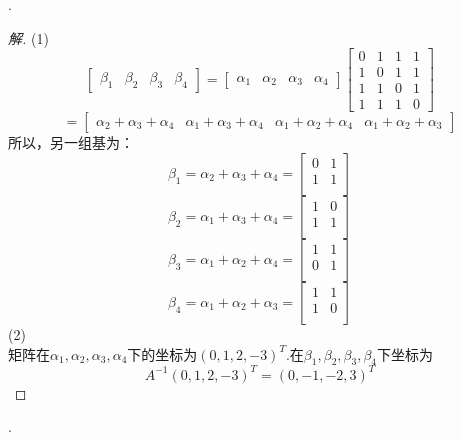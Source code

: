 \documentclass[10pt,a4paper]{report}
\begin{document}
.
\begin{proof}[解]
	(1)
	$$\left[
	\begin{matrix}
	\beta_{1} & \beta_{2} & \beta_{3} & \beta_{4}
	\end{matrix}
	\right] = \left[
	\begin{matrix}
	\alpha_{1} & \alpha_{2} & \alpha_{3} & \alpha_{4}
	\end{matrix}
	\right]\left[
	\begin{matrix}
	0 & 1 & 1 & 1\\
	1 & 0 & 1 & 1\\
	1 & 1 & 0 & 1\\
	1 & 1 & 1 & 0
	\end{matrix}
	\right]$$
	$$=\left[
	\begin{matrix}
	\alpha_{2}+\alpha_{3}+\alpha_{4} & \alpha_{1}+\alpha_{3}+\alpha_{4} & \alpha_{1}+\alpha_{2}+\alpha_{4} & \alpha_{1}+\alpha_{2}+\alpha_{3}
	\end{matrix}
	\right]$$
	所以，另一组基为：
	$$\beta_{1} = \alpha_{2}+\alpha_{3}+\alpha_{4} = \left[
	\begin{matrix}
	0 & 1\\
	1 & 1\\
	\end{matrix}
	\right]$$
	$$
	\beta_{2} = \alpha_{1}+\alpha_{3}+\alpha_{4} = \left[
	\begin{matrix}
	1 & 0\\
	1 & 1\\
	\end{matrix}
	\right]
	$$
	$$
	\beta_{3} = \alpha_{1}+\alpha_{2}+\alpha_{4} = \left[
	\begin{matrix}
	1 & 1\\
	0 & 1\\
	\end{matrix}
	\right]
	$$
	$$
	\beta_{4} = \alpha_{1}+\alpha_{2}+\alpha_{3} = \left[
	\begin{matrix}
	1 & 1\\
	1 & 0\\
	\end{matrix}
	\right]
	$$
	(2)\\
	矩阵在$\alpha_{1},\alpha_{2},\alpha_{3},\alpha_{4}$下的坐标为$(0,1,2,-3)^{T}$.在$\beta_{1},\beta_{2},\beta_{3},\beta_{4}$下坐标为
	$$A^{-1}(0,1,2,-3)^{T} = (0,-1,-2,3)^{T}
	$$
\end{proof}
.
\end{document}
